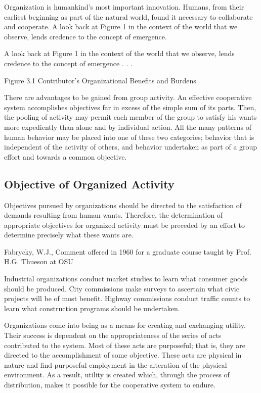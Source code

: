 Organization is humankind’s most important innovation. Humans, from their earliest beginning as part of the natural world, found it necessary to collaborate and cooperate. A look back at Figure 1 in the context of the world that we observe, lends credence to the concept of emergence.

A look back at Figure 1 in the context of the world that we observe, lends credence to the concept of emergence . . . 

Figure 3.1 Contributor’s Organizational Benefits and Burdens

There are advantages to be gained from group activity. An effective cooperative system accomplishes objectives far in excess of the simple sum of its parts. Then, the pooling of activity may permit each member of the group to satisfy his wants more expediently than alone and by individual action. All the many patterns of human behavior may be placed into one of these two categories; behavior that is independent of the activity of others, and behavior undertaken as part of a group effort and towards a common objective.

\subsection{Objective of Organized Activity}

Objectives pursued by organizations should be directed to the satisfaction of demands resulting from human wants. Therefore, the determination of appropriate objectives for organized activity must be preceded by an effort to determine precisely what these wants are. 

Fabrycky, W.J., Comment offered in 1960 for a graduate course taught by Prof. H.G. Thueson at OSU

Industrial organizations conduct market studies to learn what consumer goods should be produced. City commissions make surveys to ascertain what civic projects will be of most benefit. Highway commissions conduct traffic counts to learn what construction programs should be undertaken.

Organizations come into being as a means for creating and exchanging utility. Their success is dependent on the appropriateness of the series of acts contributed to the system. Most of these acts are purposeful; that is, they are directed to the accomplishment of some objective. These acts are physical in nature and find purposeful employment in the alteration of the physical environment. As a result, utility is created which, through the process of distribution, makes it possible for the cooperative system to endure.

